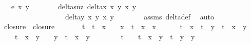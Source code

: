 \begin{isabellebody}
\ \ \ {\isachardoublequoteopen}e{\isacharprime}\ x{}\ y{}\ {\isacharequal}\ {}{\isachardoublequoteclose}\isanewline
%
\isadelimproof
%
\endisadelimproof
%
\isatagproof
{}\isamarkupfalse%
\ {\isacharminus}\isanewline
\ \ \isamarkupfalse%
\ deltas{\isacharunderscore}nz{\isacharcolon}\ {\isachardoublequoteopen}delta{\isacharunderscore}x\ x{}\ y{}\ x{}\ y{}\ {\isasymnoteq}\ {}{\isachardoublequoteclose}\isanewline
\ \ \ \ \ \ \ \ \ \ \ \ \ \ \ \ \ \ {\isachardoublequoteopen}delta{\isacharunderscore}y\ x{}\ y{}\ x{}\ y{}\ {\isasymnoteq}\ {}{\isachardoublequoteclose}\isanewline
\ \ \ \ \isamarkupfalse%
\ assms{\isacharparenleft}{}{\isacharparenright}\ delta{\isacharprime}{\isacharunderscore}def\ \isamarkupfalse%
\ auto\isanewline
\isanewline
\ \ \isamarkupfalse%
\ closure{}\ \ {\isachardoublequoteopen}closure{}\ {\isacharequal}\isanewline
\ \ \ \ {}\ {\isacharminus}\ t{\isacharcircum}{}\ {\isacharplus}\ t{\isacharcircum}{}\ {\isacharasterisk}\ x{}{\isacharcircum}{}\ {\isacharminus}\ {}\ {\isacharasterisk}\ x{}{\isacharcircum}{}\ {\isacharminus}\ t{\isacharcircum}{}\ {\isacharasterisk}\ x{}{\isacharcircum}{}\ {\isacharasterisk}\ x{}{\isacharcircum}{}\ {\isacharplus}\ \isanewline
\ \ \ \ t{\isacharcircum}{}\ {\isacharasterisk}\ x{}{\isacharcircum}{}\ {\isacharplus}\ t{\isacharcircum}{}\ {\isacharasterisk}\ y{}{\isacharcircum}{}\ {\isacharplus}\ t{\isacharcircum}{}\ {\isacharasterisk}\ x{}{\isacharcircum}{}\ {\isacharasterisk}\ y{}{\isacharcircum}{}\ {\isacharminus}\ \isanewline
\ \ \ \ t{\isacharcircum}{}\ {\isacharasterisk}\ x{}{\isacharcircum}{}\ {\isacharasterisk}\ y{}{\isacharcircum}{}\ {\isacharminus}\ {}\ {\isacharasterisk}\ y{}{\isacharcircum}{}\ {\isacharminus}\ t{\isacharcircum}{}\ {\isacharasterisk}\ x{}{\isacharcircum}{}\ {\isacharasterisk}\ y{}{\isacharcircum}{}\ {\isacharplus}\ \isanewline
\ \ \ \ {\isacharparenleft}{}\ {\isacharasterisk}\ t{\isacharcircum}{}\ {\isacharminus}\ {}\ {\isacharasterisk}\ t{\isacharcircum}{}{\isacharparenright}\ {\isacharasterisk}\ x{}{\isacharcircum}{}\ {\isacharasterisk}\ y{}{\isacharcircum}{}\ {\isacharminus}\ t{\isacharcircum}{}\ {\isacharasterisk}\ y{}{\isacharcircum}{}\ {\isacharasterisk}\ y{}{\isacharcircum}{}\ {\isacharplus}\ \isanewline

\end{isabellebody}
